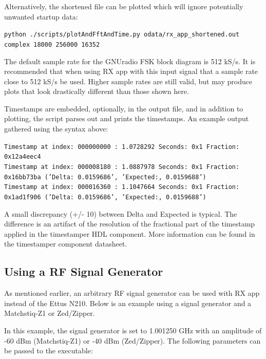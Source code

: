 \noindent Alternatively, the shortened file can be plotted which will ignore potentially unwanted startup data:\par\medskip
\noindent\texttt{python ./scripts/plotAndFftAndTime.py odata/rx\_app\_shortened.out complex 18000 256000 16352}\par\medskip
\noindent The default sample rate for the GNUradio FSK block diagram is 512 kS/s. It is recommended that when using RX app with this input signal that a sample rate close to 512 kS/s be used. Higher sample rates are still valid, but may produce plots that look drastically different than those shown here.\par\medskip
\newpage
\noindent Timestamps are embedded, optionally, in the output file, and in addition to plotting, the script parses out and prints the timestamps. An example output gathered using the syntax above:\par\medskip
\scriptsize\noindent\texttt{Timestamp at index: 000000000 :  1.0728292 Seconds: 0x1 Fraction: 0x12a4eec4  \\
Timestamp at index: 000008180 :  1.0887978 Seconds: 0x1 Fraction: 0x16bb73ba ('Delta: 0.0159686', 'Expected:, 0.0159688')\\
Timestamp at index: 000016360 :  1.1047664 Seconds: 0x1 Fraction: 0x1ad1f906 ('Delta: 0.0159686', 'Expected:, 0.0159688')}\par\medskip
\noindent\small A small discrepancy (+/- 10) between Delta and Expected is typical. The difference is an artifact of the resolution of the fractional part of the timestamp applied in the timestamper HDL component. More information can be found in the timestamper component datasheet.\par\medskip
\par\medskip

\subsection{Using a RF Signal Generator}
\noindent As mentioned earlier, an arbitrary RF signal generator can be used with RX app instead of the Ettus N210. Below is an example using a signal generator and a Matchstiq-Z1 or Zed/Zipper.\par\medskip
\noindent In this example, the signal generator is set to 1.001250 GHz with an amplitude of -60 dBm (Matchstiq-Z1) or -40 dBm (Zed/Zipper). The following parameters can be passed to the executable:\par\medskip

